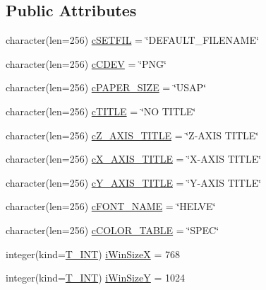\subsection*{Public Attributes}
\begin{DoxyCompactItemize}
\item 
character(len=256) \hyperlink{typetypes_1_1_t___g_r_a_p_h___c_o_n_f_i_g_u_r_a_t_i_o_n_aff23fac81d9ac52eabdbbe12187aac2b}{cSETFIL} = \char`\"{}DEFAULT\_\-FILENAME\char`\"{}
\item 
character(len=256) \hyperlink{typetypes_1_1_t___g_r_a_p_h___c_o_n_f_i_g_u_r_a_t_i_o_n_aadedfc88c0bcf38630174f5b7a6a5447}{cCDEV} = \char`\"{}PNG\char`\"{}
\item 
character(len=256) \hyperlink{typetypes_1_1_t___g_r_a_p_h___c_o_n_f_i_g_u_r_a_t_i_o_n_a3d41b7ebd7081d5fa10c19209d56f739}{cPAPER\_\-SIZE} = \char`\"{}USAP\char`\"{}
\item 
character(len=256) \hyperlink{typetypes_1_1_t___g_r_a_p_h___c_o_n_f_i_g_u_r_a_t_i_o_n_ac5c7453e946784df5e4e760c55ef0786}{cTITLE} = \char`\"{}NO TITLE\char`\"{}
\item 
character(len=256) \hyperlink{typetypes_1_1_t___g_r_a_p_h___c_o_n_f_i_g_u_r_a_t_i_o_n_a23e889cb931ae72169bb906e6e3ea057}{cZ\_\-AXIS\_\-TITLE} = \char`\"{}Z-\/AXIS TITLE\char`\"{}
\item 
character(len=256) \hyperlink{typetypes_1_1_t___g_r_a_p_h___c_o_n_f_i_g_u_r_a_t_i_o_n_a71ef908000e36b5578a0447c4d56db09}{cX\_\-AXIS\_\-TITLE} = \char`\"{}X-\/AXIS TITLE\char`\"{}
\item 
character(len=256) \hyperlink{typetypes_1_1_t___g_r_a_p_h___c_o_n_f_i_g_u_r_a_t_i_o_n_ac96bae92e65267c298bd648ab3ca483b}{cY\_\-AXIS\_\-TITLE} = \char`\"{}Y-\/AXIS TITLE\char`\"{}
\item 
character(len=256) \hyperlink{typetypes_1_1_t___g_r_a_p_h___c_o_n_f_i_g_u_r_a_t_i_o_n_ae6e8d937b37f328389b96b8cb6dfb9b7}{cFONT\_\-NAME} = \char`\"{}HELVE\char`\"{}
\item 
character(len=256) \hyperlink{typetypes_1_1_t___g_r_a_p_h___c_o_n_f_i_g_u_r_a_t_i_o_n_a64a7d703e42c4516b1bfc55f7b08d732}{cCOLOR\_\-TABLE} = \char`\"{}SPEC\char`\"{}
\item 
integer(kind=\hyperlink{namespacetypes_a4e4d040a4425196c4d43be63e7e6103a}{T\_\-INT}) \hyperlink{typetypes_1_1_t___g_r_a_p_h___c_o_n_f_i_g_u_r_a_t_i_o_n_a96cd72fbb9eeb355e762f1bacabc6e4d}{iWinSizeX} = 768
\item 
integer(kind=\hyperlink{namespacetypes_a4e4d040a4425196c4d43be63e7e6103a}{T\_\-INT}) \hyperlink{typetypes_1_1_t___g_r_a_p_h___c_o_n_f_i_g_u_r_a_t_i_o_n_a21b5a384efd9f146880b27ef75bbb2ec}{iWinSizeY} = 1024

\end{DoxyCompactItemize}
